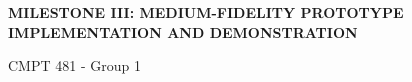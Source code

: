 \documentclass[manuscript, screen, nonacm]{acmart}
\begin{document}


            


            
            

            





  \begin{center}
       \vspace*{1cm}


        \textbf{\huge MILESTONE III: MEDIUM-FIDELITY PROTOTYPE IMPLEMENTATION AND DEMONSTRATION}

       \vspace{0.5cm}
        CMPT 481 - Group 1
            
       \vspace{1.5cm}


       \vfill
\end{center}

\end{document}
